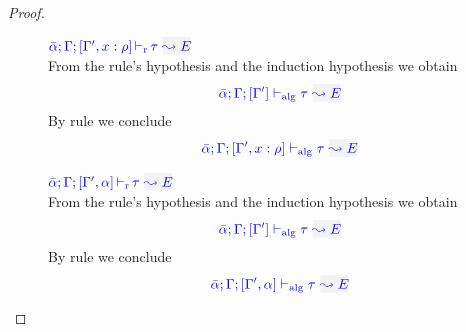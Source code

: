 \begin{proof}
\begin{description}
\item[]\quad
$\dlres{\bar\alpha}{\tenv}{\tenv',\relation{x}{\rulet}}{\type}{E}$\ \\

From the rule's hypothesis and the induction hypothesis we obtain
\begin{equation*}
  \adlres{\bar\alpha}{\tenv}{\tenv'}{\type}{E}
\end{equation*}
By rule  we conclude
\begin{equation*}
  \adlres{\bar\alpha}{\tenv}{\tenv',\relation{x}{\rulet}}{\type}{E}
\end{equation*}

\item[]\quad
$\dlres{\bar\alpha}{\tenv}{\tenv',\alpha}{\type}{E}$\ \\

From the rule's hypothesis and the induction hypothesis we obtain
\begin{equation*}
\adlres{\bar\alpha}{\tenv}{\tenv'}{\type}{E}
\end{equation*}
By rule  we conclude
\begin{equation*}
  \adlres{\bar\alpha}{\tenv}{\tenv',\alpha}{\type}{E}
\end{equation*}
\end{description}
\end{proof}

